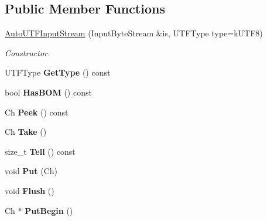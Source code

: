 \subsection*{Public Member Functions}
\begin{DoxyCompactItemize}
\item 
\hyperlink{class_auto_u_t_f_input_stream_a83837fced0971ba26dd9a8ec1575abb0}{Auto\+U\+T\+F\+Input\+Stream} (Input\+Byte\+Stream \&is, U\+T\+F\+Type type=k\+U\+T\+F8)
\begin{DoxyCompactList}\small\item\em Constructor. \end{DoxyCompactList}\item 
U\+T\+F\+Type {\bfseries Get\+Type} () const \hypertarget{class_auto_u_t_f_input_stream_a4b8a3fa5d465a98ec93373cc88102d34}{}\label{class_auto_u_t_f_input_stream_a4b8a3fa5d465a98ec93373cc88102d34}

\item 
bool {\bfseries Has\+B\+OM} () const \hypertarget{class_auto_u_t_f_input_stream_a74bf5085aaefeb533cbe31719cb0be23}{}\label{class_auto_u_t_f_input_stream_a74bf5085aaefeb533cbe31719cb0be23}

\item 
Ch {\bfseries Peek} () const \hypertarget{class_auto_u_t_f_input_stream_a091e55c06a8013b978c9bab05c9068e3}{}\label{class_auto_u_t_f_input_stream_a091e55c06a8013b978c9bab05c9068e3}

\item 
Ch {\bfseries Take} ()\hypertarget{class_auto_u_t_f_input_stream_a652cd1ae8bd848a5ecce4efa1ebd0f38}{}\label{class_auto_u_t_f_input_stream_a652cd1ae8bd848a5ecce4efa1ebd0f38}

\item 
size\+\_\+t {\bfseries Tell} () const \hypertarget{class_auto_u_t_f_input_stream_a759b3d2690679ff9eef0c18cb2fbb0cf}{}\label{class_auto_u_t_f_input_stream_a759b3d2690679ff9eef0c18cb2fbb0cf}

\item 
void {\bfseries Put} (Ch)\hypertarget{class_auto_u_t_f_input_stream_a5ea730d1ab715f58ce4f9e3dcd77810a}{}\label{class_auto_u_t_f_input_stream_a5ea730d1ab715f58ce4f9e3dcd77810a}

\item 
void {\bfseries Flush} ()\hypertarget{class_auto_u_t_f_input_stream_aecc08f52794d761fc1b729907a83dcf8}{}\label{class_auto_u_t_f_input_stream_aecc08f52794d761fc1b729907a83dcf8}

\item 
Ch $\ast$ {\bfseries Put\+Begin} ()\hypertarget{class_auto_u_t_f_input_stream_a761841842c147c0bb1a69bfacbc117a2}{}\label{class_auto_u_t_f_input_stream_a761841842c147c0bb1a69bfacbc117a2}


\end{DoxyCompactItemize}
